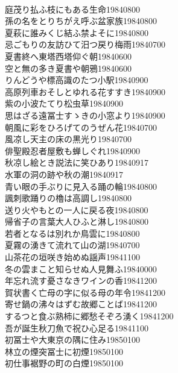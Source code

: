 \begin{multicols}{2}
\\庭茂り払ふ枝にもある生命\hfill{19840800}
\\孫の名をとりちがえ呼ぶ盆家族\hfill{19840800}
\\夏萩に誰みくじ結ふ禁よそに\hfill{19840800}
\\忌ごもりの友訪ひて汨つ戻り梅雨\hfill{19840700}
\\夏書終へ東塔西塔仰ぐ朝\hfill{19840600}
\\空と無の多き夏書や朝鴉\hfill{19840600}
\\りんどうや標高識のたつ小駅\hfill{19840900}
\\高原列車おそしとゆれる花すすき\hfill{19840900}
\\紫の小波たてり松虫草\hfill{19840900}
\\思はざる遠冨士すゝきの小窓より\hfill{19840900}
\\朝風に彩をひろげてのうぜん花\hfill{19840700}
\\風凉し天主の床の黒光り\hfill{19840700}
\\俳聖殿忍者屋敷も蝉しぐれ\hfill{19840900}
\\秋凉し絵とき説法に笑ひあり\hfill{19840917}
\\水軍の洞の跡や秋の潮\hfill{19840917}
\\青い眼の手ぶりに見入る踊の輪\hfill{19840800}
\\諷刺歌踊りの櫓は高調し\hfill{19840800}
\\送り火やもとの一人に戻る夜\hfill{19840800}
\\帰省子の言葉大人ひふと淋し\hfill{19840800}
\\若者となるは別れか鳥雲に\hfill{19840800}
\\夏霧の湧きて流れて山の湖\hfill{19840700}
\\山茶花の垣咲き始めぬ謡声\hfill{19841100}
\\冬の雲まこと知らせぬ人見舞ふ\hfill{19840000}
\\年忘れ流す憂さなきワインの香\hfill{19841200}
\\賀状書く亡母の字に似る母の年令\hfill{19841200}
\\寄せ鍋の沸々はずむ故郷ことば\hfill{19841200}
\\するつと食ぶ熟柿に郷愁そぞろ湧く\hfill{19841200}
\\吾が誕生秋刀魚で祝ひ心足る\hfill{19841100}
\\初冨士や大東京の隅に住み\hfill{19850100}
\\林立の煙突冨士に初煙\hfill{19850100}
\\初仕事裾野の町の白煙\hfill{19850100}

\end{multicols}
